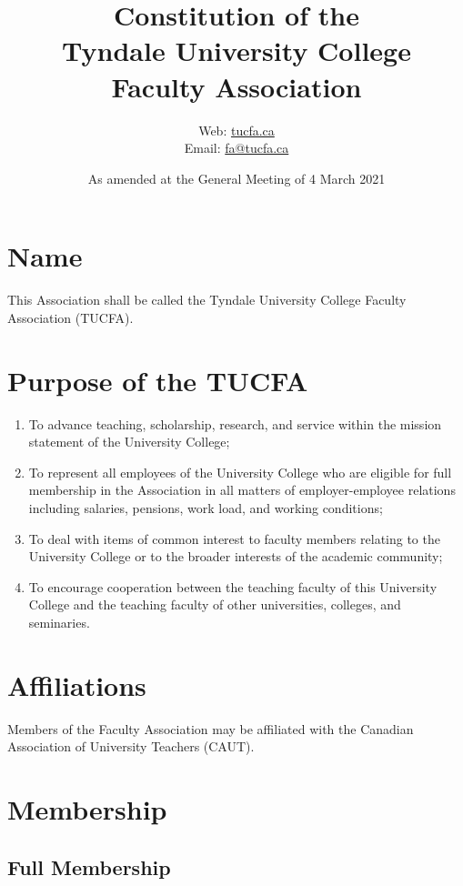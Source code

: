 \documentclass[12pt]{article}
\title{Constitution of the\\Tyndale University College\\Faculty Association}
\author{%
  Web: \href{http://tucfa.ca/}{tucfa.ca}\\
  Email: \href{mailto:fa@tucfa.ca}{fa@tucfa.ca}
}
\date{%
  As amended at the General Meeting of 4 March 2021
}
\begin{document}
\maketitle
\tableofcontents

\section{Name}

This Association shall be called the Tyndale University College Faculty Association (TUCFA).

\section{Purpose of the TUCFA}

\begin{enumerate}
\item
To advance teaching, scholarship, research, and service within the mission statement of the University College;
\item
To represent all employees of the University College who are eligible for full membership in the Association in all matters of employer-employee relations including salaries, pensions, work load, and working conditions;
\item
To deal with items of common interest to faculty members relating to the University College or to the broader interests of the academic community;
\item
To encourage cooperation between the teaching faculty of this University College and the teaching faculty of other universities, colleges, and seminaries.
\end{enumerate}

\section{Affiliations}

Members of the Faculty Association may be affiliated with the Canadian Association of University Teachers (CAUT).

\section{Membership}

\subsection{Full Membership}
\end{document}
